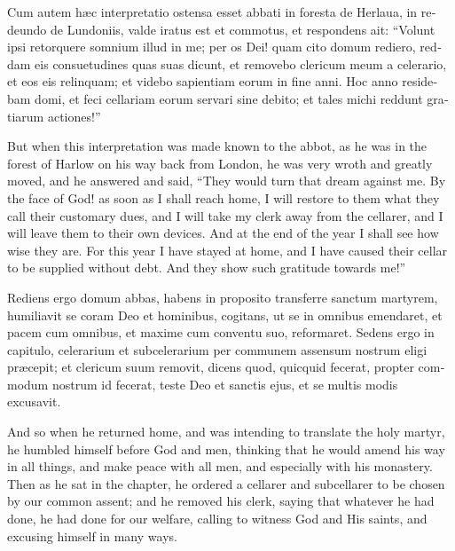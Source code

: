\documentclass{book}
\begin{document}
\begin{paracol}{2}
\switchcolumn*

\begin{otherlanguage}{latin}
Cum autem h\ae{}c interpretatio ostensa esset abbati in foresta de Herlaua, in redeundo de Lundoniis, valde iratus est et commotus, et respondens ait: ``Volunt ipsi retorquere somnium illud in me; per os Dei! quam cito domum rediero, reddam eis consuetudines quas suas dicunt, et removebo clericum meum a celerario, et eos eis relinquam; et videbo sapientiam eorum in fine anni. Hoc anno residebam domi, et feci cellariam eorum servari sine debito; et tales michi reddunt gratiarum actiones!'' 
\end{otherlanguage}

\switchcolumn

But when this interpretation was made known to the abbot, as he was in the forest of Harlow on his way back from London, he was very wroth and greatly moved, and he answered and said, ``They would turn that dream against me. By the face of God! as soon as I shall reach home, I will restore to them what they call their customary dues, and I will take my clerk away from the cellarer, and I will leave them to their own devices. And at the end of the year I shall see how wise they are. For this year I have stayed at home, and I have caused their cellar to be supplied without debt. And they show such gratitude towards me!''

\switchcolumn*

\begin{otherlanguage}{latin}
Rediens ergo domum abbas, habens in proposito transferre sanctum martyrem, humiliavit se coram Deo et hominibus, cogitans, ut se in omnibus emendaret, et pacem cum omnibus, et maxime cum conventu suo, reformaret. Sedens ergo in capitulo, celerarium et subcelerarium per communem assensum nostrum eligi pr\ae{}cepit; et clericum suum removit, dicens quod, quicquid fecerat, propter commodum nostrum id fecerat, teste Deo et sanctis ejus, et se multis modis excusavit.
\end{otherlanguage}

\switchcolumn

And so when he returned home, and was intending to translate the holy martyr, he humbled himself before God and men, thinking that he would amend his way in all things, and make peace with all men, and especially with his monastery. Then as he sat in the chapter, he ordered a cellarer and subcellarer to be chosen by our common assent; and he removed his clerk, saying that whatever he had done, he had done for our welfare, calling to witness God and His saints, and excusing himself in many ways.


\end{paracol}
\end{document}
